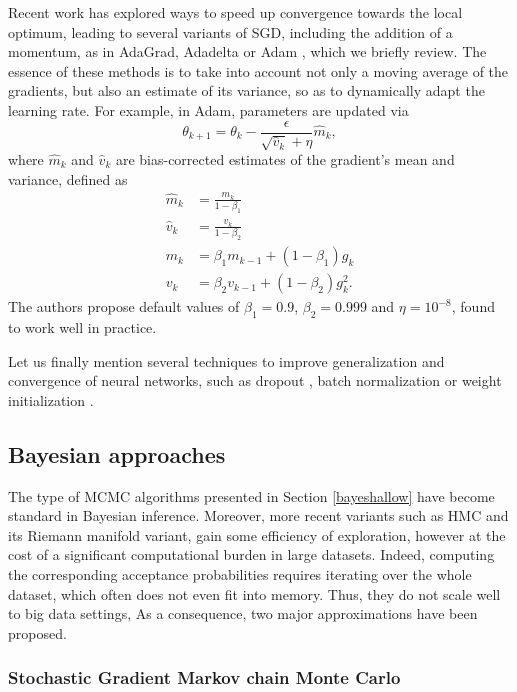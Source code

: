 Recent work has explored ways to 
speed up convergence towards the local optimum, 
leading to several variants of SGD, including the 
 addition of a momentum, as in AdaGrad, Adadelta or Adam \citep{kingma2014adam}, which we briefly review. The essence of these methods is to take into account not only a moving average of the gradients, but also an estimate of its variance, so as to dynamically adapt the learning rate. For example, in Adam, 
  parameters are updated via 
$$
\theta_{k+1} = \theta_k - \frac{\epsilon}{\sqrt{\hat{v}_k} + \eta} \hat{m}_k,
$$
where $\hat{m}_k$ and $\hat{v}_k$ are bias-corrected estimates of the gradient's mean and variance, defined as
\begin{align*}
    \hat{m}_k &= \frac{m_k}{1 - \beta_{1}} \\
    \hat{v}_k &= \frac{v_k}{1 - \beta_{2}} \\
    m_k &= \beta_1 m_{k-1} + (1 - \beta_1)g_k \\
    v_k &= \beta_2 v_{k-1} + (1 - \beta_2)g_k^2.
\end{align*}
The authors propose default values of $\beta_1 = 0.9$, $\beta_2 = 0.999$ and $\eta = 10^{-8}$, found to work well in practice.


Let us finally mention 
several techniques to improve generalization and convergence of neural networks, such as dropout \citep{srivastava2014dropout}, batch normalization \citep{ioffe2015batch} or weight initialization \citep{glorot2010understanding}.


\subsection{Bayesian approaches}

The type of MCMC algorithms presented in Section \ref{bayeshallow}
have become standard in Bayesian inference.
 Moreover, more recent variants such as HMC
 and its Riemann
manifold variant, gain 
some efficiency of exploration, however at the cost of a significant computational burden in large datasets. Indeed, 
computing the corresponding acceptance probabilities 
 requires iterating over the whole dataset, which often does not even
 fit into memory. Thus, they 
  do not scale well to big data settings, 
 As a consequence, two major approximations have been proposed.

\subsubsection{Stochastic Gradient Markov chain Monte Carlo}\label{bayesdeep} 

